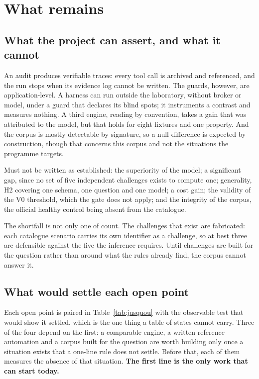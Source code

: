 \section{What remains}
\label{sec:reste}

\subsection{What the project can assert, and what it cannot}

An audit produces verifiable traces: every tool call is archived and referenced,
and the run stops when its evidence log cannot be written. The guards, however, are
application-level. A harness can run outside the laboratory, without broker or model,
under a guard that declares its blind spots; it instruments a contrast and measures
nothing. A third engine, reading by convention, takes a gain that was attributed to
the model, but that holds for eight fixtures and one property. And the corpus is mostly
detectable by signature, so a null difference is expected by construction, though that
concerns this corpus and not the situations the programme targets.

Must not be written as established: the superiority of the model; a significant
gap, since no set of five independent challenges exists to compute one; generality, H2 covering
one schema, one question and one model; a cost gain; the validity of the V0
threshold, which the gate does not apply; and the integrity of the corpus, the
official healthy control being absent from the catalogue.

The shortfall is not only one of count. The challenges that exist are fabricated:
each catalogue scenario carries its own identifier as a challenge, so at best three
are defensible against the five the inference requires. Until challenges are built
for the question rather than around what the rules already find, the corpus cannot
answer it.

\subsection{What would settle each open point}
\label{sec:jusquou}

Each open point is paired in Table~\ref{tab:jusquou} with the observable test that
would show it settled, which is the one thing a table of states cannot carry. Three of the four
depend on the first: a comparable engine, a written reference automation and a corpus
built for the question are worth building only once a situation exists that a
one-line rule does not settle. Before that, each of them measures the absence of
that situation. \textbf{The first line is the only work that can start today.}


